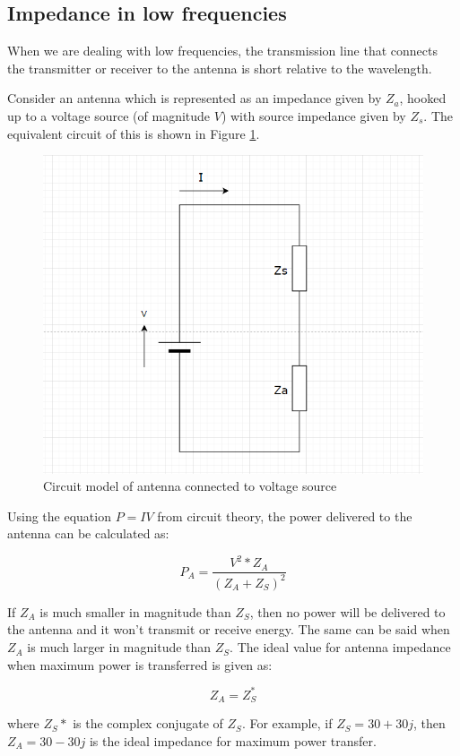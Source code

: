 \documentclass[a4paper,11pt]{jsarticle}
\begin{document}
\subsection{Impedance in low frequencies}

When we are dealing with low frequencies,
the transmission line that connects the transmitter or receiver
to the antenna is short relative to the wavelength.

Consider an antenna which is represented as an impedance given by $Z_a$,
hooked up to a voltage source (of magnitude $V$) with source impedance given by $Z_s$.
The equivalent circuit of this is shown in
Figure \ref{fig:low_freq_circuit_diagram}.

\begin{figure}
  \begin{center}
    \includegraphics[clip, keepaspectratio, width=0.5\linewidth]{img/low_freq_circuit_diagram.png}
    \caption{Circuit model of antenna connected to voltage source}
    \label{fig:low_freq_circuit_diagram}
  \end{center}
\end{figure}

Using the equation $P=IV$ from circuit theory,
the power delivered to the antenna can be calculated as:

\begin{equation}
  P_A = \frac{V^2 * Z_A}{(Z_A + Z_S) ^2}
\end{equation}

If $Z_A$ is much smaller in magnitude than $Z_S$,
then no power will be delivered to the antenna and
it won't transmit or receive energy.
The same can be said when $Z_A$ is much larger in magnitude than $Z_S$.
The ideal value for antenna impedance when maximum power is transferred is given as:

\begin{equation}
  Z_A = Z_S^*
\end{equation}

where $Z_S*$ is the complex conjugate of $Z_S$.
For example, if $Z_S = 30 + 30j$, then $Z_A = 30 - 30j$ is the ideal
impedance for maximum power transfer.
\end{document}

